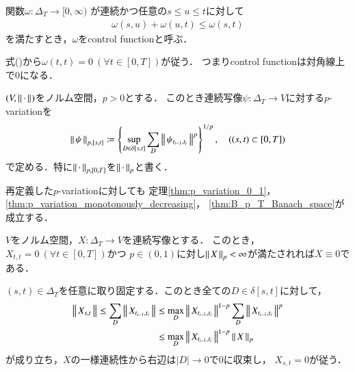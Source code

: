 	\begin{screen}
		\begin{dfn}
			関数$\omega:\Delta_T \longrightarrow [0,\infty)$
			が連続かつ任意の$s \leq u \leq t$に対して
			\begin{align}
				\omega(s,u) + \omega(u,t) \leq \omega(s,t)
				\label{eq:control_function_subadditivity}
			\end{align}
			を満たすとき，$\omega$をcontrol functionと呼ぶ．
		\end{dfn}
	\end{screen}
	
	式()から$\omega(t,t)=0\ (\forall t \in [0,T])$が従う．
	つまりcontrol functionは対角線上で0になる．
	
	\begin{screen}
		\begin{dfn}
			$(V,\left\|\, \cdot\, \right\|_{})$をノルム空間，$p > 0$とする．
			このとき連続写像$\psi:\Delta_T \longrightarrow V$に対する$p$-variationを
			\begin{align}
				\left\|\, \psi\, \right\|_{p,[s,t]}
				\coloneqq \left\{ \operatorname*{sup}_{D \in \delta[s,t]}  \sum_D \left\|\, \psi_{t_{i-1},t_i}\, \right\|_{}^p \right\}^{1/p},
				\quad ((s,t) \subset [0,T])
			\end{align}
			で定める．特に$\left\|\, \cdot\, \right\|_{p,[0,T]}$を$\left\|\, \cdot\, \right\|_{p}$と書く．
		\end{dfn}
	\end{screen}
	
	再定義した$p$-variationに対しても
	定理\ref{thm:p_variation_0_1}，\ref{thm:p_variation_monotonously_decreasing}，
	\ref{thm:B_p_T_Banach_space}が成立する．
	\begin{screen}
		\begin{thm}
			$V$をノルム空間，$X:\Delta_T \longrightarrow V$を連続写像とする．
			このとき，$X_{t,t} = 0\ (\forall t \in [0,T])$かつ
			$p \in (0, 1)$に対し$\left\|\, X\, \right\|_{p} < \infty$が満たされれば$X \equiv 0$である．
		\end{thm}
	\end{screen}

	\begin{prf}
		$(s,t) \in \Delta_T$を任意に取り固定する．このとき全ての$D \in \delta[s,t]$に対して，
		\begin{align}
			\left\|\, X_{s,t}\, \right\|_{} \leq \sum_D \left\|\, X_{t_{i-1},t_i}\, \right\|_{}
			&\leq \operatorname*{max}_{D} \left\|\, X_{t_{i-1},t_i}\, \right\|_{}^{1-p} 
				\sum_D \left\|\, X_{t_{i-1},t_i}\, \right\|_{}^p \\
			&\leq \operatorname*{max}_{D} \left\|\, X_{t_{i-1},t_i}\, \right\|_{}^{1-p} \left\|\, X\, \right\|_{p}
		\end{align}
		が成り立ち，$X$の一様連続性から右辺は$|D| \longrightarrow 0$で$0$に収束し，
		$X_{s,t} = 0$が従う．
		\QED
	\end{prf}
	
